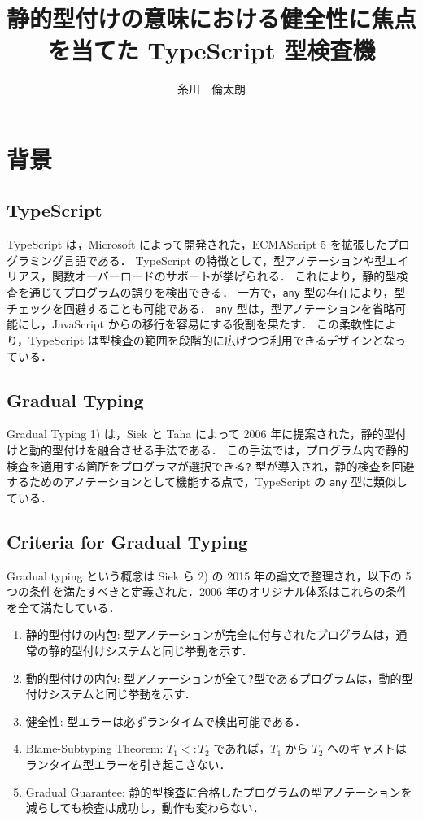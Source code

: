 \documentclass[11pt,twocolumn]{classes/yokou}
\title{静的型付けの意味における健全性に焦点を当てた TypeScript 型検査機}
\author{糸川　倫太朗}
\begin{document}
\maketitle

\section{背景}

\subsection{TypeScript}

TypeScript は，Microsoft によって開発された，ECMAScript 5 を拡張したプログラミング言語である．
TypeScript の特徴として，型アノテーションや型エイリアス，関数オーバーロードのサポートが挙げられる．
これにより，静的型検査を通じてプログラムの誤りを検出できる．
一方で，\texttt{any} 型の存在により，型チェックを回避することも可能である．
\texttt{any} 型は，型アノテーションを省略可能にし，JavaScript からの移行を容易にする役割を果たす．
この柔軟性により，TypeScript は型検査の範囲を段階的に広げつつ利用できるデザインとなっている．

\subsection{Gradual Typing}

Gradual Typing 1) は，Siek と Taha によって 2006 年に提案された，静的型付けと動的型付けを融合させる手法である．
この手法では，プログラム内で静的検査を適用する箇所をプログラマが選択できる\texttt{?} 型が導入され，静的検査を回避するためのアノテーションとして機能する点で，TypeScript の \texttt{any} 型に類似している．

\subsection{Criteria for Gradual Typing}

Gradual typing という概念は Siek ら 2) の 2015 年の論文で整理され，以下の 5 つの条件を満たすべきと定義された．2006 年のオリジナル体系はこれらの条件を全て満たしている．

\begin{enumerate}
	\item 静的型付けの内包: 型アノテーションが完全に付与されたプログラムは，通常の静的型付けシステムと同じ挙動を示す．
	\item 動的型付けの内包: 型アノテーションが全て\texttt{?}型であるプログラムは，動的型付けシステムと同じ挙動を示す．
	\item 健全性: 型エラーは必ずランタイムで検出可能である．
	\item Blame-Subtyping Theorem: $T_1 <: T_2$ であれば，$T_1$ から $T_2$ へのキャストはランタイム型エラーを引き起こさない．
	\item Gradual Guarantee: 静的型検査に合格したプログラムの型アノテーションを減らしても検査は成功し，動作も変わらない．
\end{enumerate}
\end{document}
